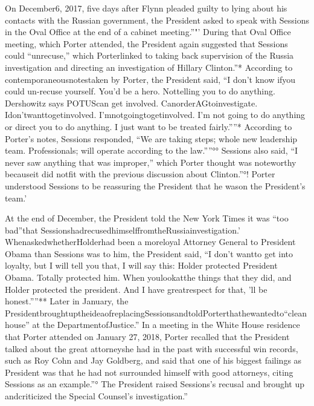 On December6, 2017, five days after Flynn pleaded guilty to lying about his contacts with the Russian government, the President asked to speak with Sessions in the Oval Office at the end of a cabinet meeting.”"’ During that Oval Office meeting, which Porter attended, the President again suggested that Sessions could “unrecuse,” which Porterlinked to taking back supervision of the Russia investigation and directing an investigation of Hillary Clinton.”* According to contemporaneousnotestaken by Porter, the President said, “I don’t know ifyou could un-recuse yourself. You’d be a hero. Nottelling you to do anything. Dershowitz says POTUScan get involved. CanorderAGtoinvestigate. Idon’twanttogetinvolved. I’mnotgoingtogetinvolved. I’m not going to do anything or direct you to do anything. I just want to be treated fairly.””* According to Porter’s notes, Sessions responded, “We are taking steps; whole new leadership team. Professionals; will operate according to the law.””°° Sessions also said, “I never saw anything that was improper,” which Porter thought was noteworthy becauseit did notfit with the previous discussion about Clinton.”°! Porter understood Sessions to be reassuring the President that he wason the President’s team.’

At the end of December, the President told the New York Times it was “too bad”that SessionshadrecusedhimselffromtheRussiainvestigation.’ WhenaskedwhetherHolderhad been a moreloyal Attorney General to President Obama than Sessions was to him, the President said, “I don’t wantto get into loyalty, but I will tell you that, I will say this: Holder protected President Obama. Totally protected him. When youlookatthe things that they did, and Holder protected the president. And I have greatrespect for that, ’ll be honest.””** Later in January, the PresidentbroughtuptheideaofreplacingSessionsandtoldPorterthathewantedto“cleanhouse” at the DepartmentofJustice.” In a meeting in the White House residence that Porter attended on January 27, 2018, Porter recalled that the President talked about the great attorneyshe had in the past with successful win records, such as Roy Cohn and Jay Goldberg, and said that one of his biggest failings as President was that he had not surrounded himself with good attorneys, citing Sessions as an example.”° The President raised Sessions’s recusal and brought up andcriticized the Special Counsel’s investigation.”

